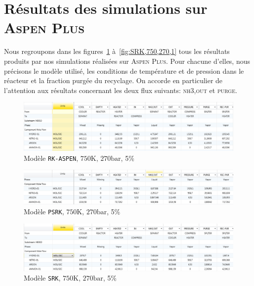 \section{Résultats des simulations sur \textsc{Aspen Plus}}
\label{sec:aspen_simulation}

Nous regroupons dans les figures~\ref{fig:RK-ASPEN} à~\ref{fig:SRK,750,270,1}
tous les résultats produits par nos simulations réalisées sur \textsc{Aspen Plus}. 
Pour chacune d'elles, nous précisons le modèle utilisé,
les conditions de température et de pression dans le réacteur 
et la fraction purgée du recyclage. 
On accorde en particulier de l'attention aux résultats 
concernant les deux flux suivants: \textsc{nh3,out} et \textsc{purge}.

\graphicspath{{./img_aspen/}}

\begin{figure}[h!]
	\begin{center}
		\includegraphics[scale=0.5]{RK-ASPEN.png}
	\end{center}
	\caption{Modèle \texttt{RK-ASPEN}, $750\si{\kelvin}$, $270\si{\bar}$, 5\%}
	\label{fig:RK-ASPEN}
\end{figure}

\begin{figure}[h!]
	\begin{center}
		\includegraphics[scale=0.5]{PSRK.png}
	\end{center}
	\caption{Modèle \texttt{PSRK}, $750\si{\kelvin}$, $270\si{\bar}$, 5\%}
	\label{fig:PSRK}
\end{figure}

\begin{figure}[h!]
	\begin{center}
		\includegraphics[scale=0.5]{SRK,750,270,5.png}
	\end{center}
	\caption{Modèle \texttt{SRK}, $750\si{\kelvin}$, $270\si{\bar}$, 5\%}
	\label{fig:SRK,750,270,0.05}
\end{figure}

